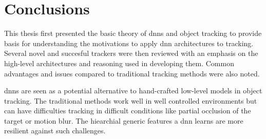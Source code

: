 \section{Conclusions}

This thesis first presented the basic theory of \ac{dnn}s and object tracking to
provide basis for understanding the motivations to apply \ac{dnn} architectures
to tracking. Several novel and succesful trackers were then reviewed with an emphasis
on the high-level architectures and reasoning used in developing them. Common advantages
and issues compared to traditional tracking methods were also noted.

\ac{dnn}s are seen as a potential alternative to hand-crafted low-level models in
object tracking. The traditional methods work well in well controlled environments
but can have difficulties tracking in difficult conditions like partial occlusion
of the target or motion blur. The hiearchial generic features a \ac{dnn} learns
are more resilient against such challenges.
